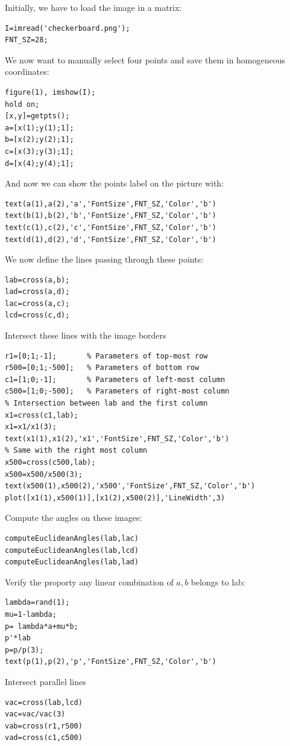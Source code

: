 \documentclass[12pt, a4paper]{report}
\newtheorem[style=M,bodystyle=\normalfont]{theorem}{Theorem}
\newtheorem[style=M,bodystyle=\normalfont]{corollary}{Corollary}
\newtheorem[style=M,bodystyle=\normalfont]{lemma}{Lemma}
\newtheorem[style=M,bodystyle=\normalfont]{definition}{Definition}
\begin{document}
\begin{Answer}[ref=1]
    Initially, we have to load the image in a matrix: 
    \begin{lstlisting}[frame=single, numbers=none, style=Matlab-bw]
I=imread('checkerboard.png');
FNT_SZ=28;
    \end{lstlisting}
    We now want to manually select four points and save them in homogeneous coordinates: 
    \begin{lstlisting}[frame=single, numbers=none, style=Matlab-bw]
figure(1), imshow(I);
hold on;
[x,y]=getpts();
a=[x(1);y(1);1];
b=[x(2);y(2);1];
c=[x(3);y(3);1];
d=[x(4);y(4);1];
    \end{lstlisting}
    And now we can show the points label on the picture with: 
    \begin{lstlisting}[frame=single, numbers=none, style=Matlab-bw]
text(a(1),a(2),'a','FontSize',FNT_SZ,'Color','b')
text(b(1),b(2),'b','FontSize',FNT_SZ,'Color','b')
text(c(1),c(2),'c','FontSize',FNT_SZ,'Color','b')
text(d(1),d(2),'d','FontSize',FNT_SZ,'Color','b')
    \end{lstlisting}
    We now define the lines passing through these points: 
    \begin{lstlisting}[frame=single, numbers=none, style=Matlab-bw]
lab=cross(a,b); 
lad=cross(a,d); 
lac=cross(a,c); 
lcd=cross(c,d);
    \end{lstlisting}
    Intersect these lines with the image borders
    \begin{lstlisting}[frame=single, numbers=none, style=Matlab-bw]
r1=[0;1;-1];       % Parameters of top-most row
r500=[0;1;-500];   % Parameters of bottom row
c1=[1;0;-1];       % Parameters of left-most column
c500=[1;0;-500];   % Parameters of right-most column
% Intersection between lab and the first column
x1=cross(c1,lab); 
x1=x1/x1(3); 
text(x1(1),x1(2),'x1','FontSize',FNT_SZ,'Color','b')
% Same with the right most column
x500=cross(c500,lab);
x500=x500/x500(3);
text(x500(1),x500(2),'x500','FontSize',FNT_SZ,'Color','b')
plot([x1(1),x500(1)],[x1(2),x500(2)],'LineWidth',3)
        \end{lstlisting}
    Compute the angles on these images:
    \begin{lstlisting}[frame=single, numbers=none, style=Matlab-bw]
computeEuclideanAngles(lab,lac) 
computeEuclideanAngles(lab,lcd) 
computeEuclideanAngles(lab,lad) 
    \end{lstlisting}
    Verify the proporty any linear combination of $a,b$ belongs to lab: 
    \begin{lstlisting}[frame=single, numbers=none, style=Matlab-bw]
lambda=rand(1);
mu=1-lambda;
p= lambda*a+mu*b;
p'*lab
p=p/p(3);
text(p(1),p(2),'p','FontSize',FNT_SZ,'Color','b')
    \end{lstlisting}
    Intersect parallel lines
    \begin{lstlisting}[frame=single, numbers=none, style=Matlab-bw]
vac=cross(lab,lcd)
vac=vac/vac(3) 
vab=cross(r1,r500)
vad=cross(c1,c500)
    \end{lstlisting}

\end{Answer}
\end{document}
